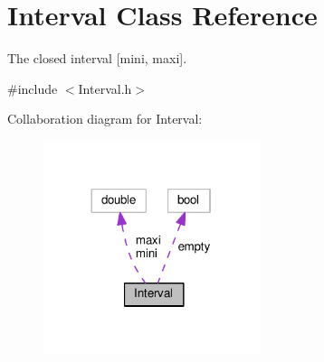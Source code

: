 \hypertarget{classInterval}{}\section{Interval Class Reference}
\label{classInterval}


The closed interval \mbox{[}mini, maxi\mbox{]}.  




{\ttfamily \#include $<$Interval.\+h$>$}



Collaboration diagram for Interval\+:\nopagebreak
\begin{figure}[H]
\begin{center}
\leavevmode
\includegraphics[width=180pt]{classInterval__coll__graph}
\end{center}
\end{figure}

